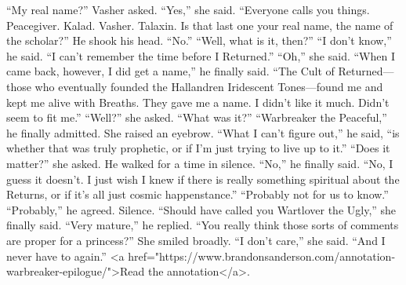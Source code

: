 “My real name?” Vasher asked.
“Yes,” she said. “Everyone calls you things. Peacegiver. Kalad. Vasher. Talaxin. Is that last one your real name, the name of the scholar?”
He shook his head. “No.”
“Well, what is it, then?”
“I don’t know,” he said. “I can’t remember the time before I Returned.”
“Oh,” she said.
“When I came back, however, I did get a name,” he finally said. “The Cult of Returned—those who eventually founded the Hallandren Iridescent Tones—found me and kept me alive with Breaths. They gave me a name. I didn’t like it much. Didn’t seem to fit me.”
“Well?” she asked. “What was it?”
“Warbreaker the Peaceful,” he finally admitted.
She raised an eyebrow.
“What I can’t figure out,” he said, “is whether that was truly prophetic, or if I’m just trying to live up to it.”
“Does it matter?” she asked.
He walked for a time in silence. “No,” he finally said. “No, I guess it doesn’t. I just wish I knew if there is really something spiritual about the Returns, or if it’s all just cosmic happenstance.”
“Probably not for us to know.”
“Probably,” he agreed.
Silence.
“Should have called you Wartlover the Ugly,” she finally said.
“Very mature,” he replied. “You really think those sorts of comments are proper for a princess?”
She smiled broadly. “I don’t care,” she said. “And I never have to again.”
<a href="https://www.brandonsanderson.com/annotation-warbreaker-epilogue/">Read the annotation</a>.
